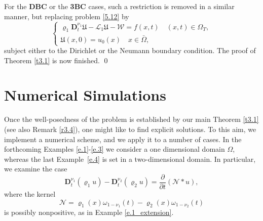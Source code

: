 \documentclass[reqno]{amsart}
\theoremstyle{definition}
\numberwithin{equation}{section}
\begin{document}
For the \textbf{DBC} or the \textbf{3BC} cases, such a restriction is removed
in a similar manner, but replacing problem \eqref{5.12} by
\[
\begin{cases}
\varrho_{1}\mathbf{D}_{t}^{\nu_{1}}\mathfrak{U}-\mathcal{L}_{1}\mathfrak{U}-\mathcal{W}=f(x,t)\quad (x,t)\in\Omega_{T},\\
\mathfrak{U}(x,0)=u_{0}(x)\quad x\in\bar{\Omega},
\end{cases}
\]
subject either to the Dirichlet or the Neumann boundary condition.
The proof of Theorem \ref{t3.1} is now finished.
\qed





\section{Numerical Simulations}
\label{s6}

\noindent 
Once the well-posedness of the problem is established
by our main Theorem \ref{t3.1} (see also Remark \ref{r3.4}),
one might like to find explicit solutions. To this aim,
we implement a numerical scheme, and we apply it
to a number of cases. In the forthcoming
Examples \ref{e.1}-\ref{e.3} we consider a one dimensional domain $\Omega$,
whereas the last Example~\ref{e.4} is set in a two-dimensional domain.
In particular, we examine the case
\[
\mathbf{D}_{t}^{\nu_{1}}(\varrho_1u)-\mathbf{D}_{t}^{\nu_2}(\varrho_2 u)=\frac{\partial}{\partial t}(\mathcal{N}* u),
\]
where the kernel
\[
\mathcal{N}=\varrho_{1}(x)\omega_{1-\nu_{1}}(t)-\varrho_2(x)\omega_{1-\nu_2}(t)
\]
is possibly nonpositive, as in Example \ref{e.1_extension}. 
\end{document}
